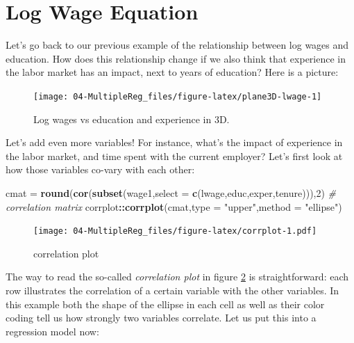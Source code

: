 \documentclass[]{book}
\newenvironment{Shaded}{\begin{snugshade}}{\end{snugshade}}
\newcommand{\KeywordTok}[1]{\textcolor[rgb]{0.13,0.29,0.53}{\textbf{#1}}}
\newcommand{\DataTypeTok}[1]{\textcolor[rgb]{0.13,0.29,0.53}{#1}}
\newcommand{\DecValTok}[1]{\textcolor[rgb]{0.00,0.00,0.81}{#1}}
\newcommand{\StringTok}[1]{\textcolor[rgb]{0.31,0.60,0.02}{#1}}
\newcommand{\CommentTok}[1]{\textcolor[rgb]{0.56,0.35,0.01}{\textit{#1}}}
\newcommand{\OperatorTok}[1]{\textcolor[rgb]{0.81,0.36,0.00}{\textbf{#1}}}
\newcommand{\NormalTok}[1]{#1}
\begin{document}
\section{Log Wage Equation}\label{log-wage-equation}

Let's go back to our previous example of the relationship between log
wages and education. How does this relationship change if we also think
that experience in the labor market has an impact, next to years of
education? Here is a picture:

\begin{figure}

{\centering \texttt{[image: 04-MultipleReg\_files/figure-latex/plane3D-lwage-1]} 

}

\caption{Log wages vs education and experience in 3D.}\label{fig:plane3D-lwage}
\end{figure}

Let's add even more variables! For instance, what's the impact of
experience in the labor market, and time spent with the current
employer? Let's first look at how those variables co-vary with each
other:

\begin{Shaded}
\begin{Highlighting}[]
\NormalTok{cmat =}\StringTok{ }\KeywordTok{round}\NormalTok{(}\KeywordTok{cor}\NormalTok{(}\KeywordTok{subset}\NormalTok{(wage1,}\DataTypeTok{select =} \KeywordTok{c}\NormalTok{(lwage,educ,exper,tenure))),}\DecValTok{2}\NormalTok{) }\CommentTok{# correlation matrix}
\NormalTok{corrplot}\OperatorTok{::}\KeywordTok{corrplot}\NormalTok{(cmat,}\DataTypeTok{type =} \StringTok{"upper"}\NormalTok{,}\DataTypeTok{method =} \StringTok{"ellipse"}\NormalTok{)}
\end{Highlighting}
\end{Shaded}

\begin{figure}
\centering
\texttt{[image: 04-MultipleReg\_files/figure-latex/corrplot-1.pdf]}
\caption{\label{fig:corrplot}correlation plot}
\end{figure}

The way to read the so-called \emph{correlation plot} in figure
\ref{fig:corrplot} is straightforward: each row illustrates the
correlation of a certain variable with the other variables. In this
example both the shape of the ellipse in each cell as well as their
color coding tell us how strongly two variables correlate. Let us put
this into a regression model now:
\end{document}
